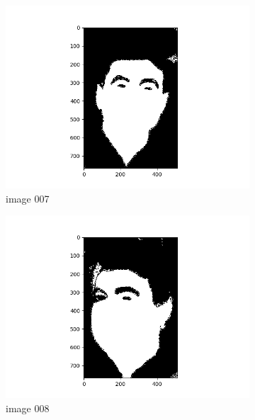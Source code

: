 \documentclass[11pt]{report}
\begin{document}
\begin{figure}[H]
\begin{subfigure}{0.3\textwidth}
        \includegraphics[width=\textwidth]{Task 2 Plots/bin_mask_007.png}
        \caption{image 007}
        \label{fig:binmask7}
    \end{subfigure}
    \begin{subfigure}{0.3\textwidth}
        \centering
        \includegraphics[width=\textwidth]{Task 2 Plots/bin_mask_008.png}
        \caption{image 008}
        \label{fig:binmask8}
    \end{subfigure}
    \begin{subfigure}{0.3\textwidth}
        \centering

\end{subfigure}
\end{figure}
\end{document}
